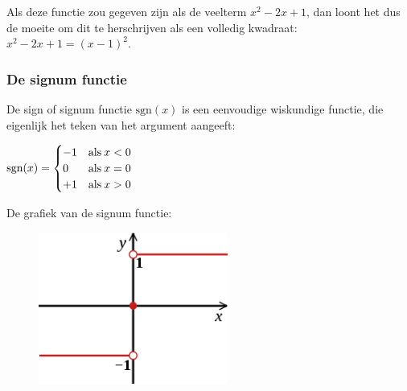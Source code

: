 \noindent Als deze functie zou gegeven zijn als de veelterm ${\displaystyle x^{2}-2x+1}$,
dan loont het dus de moeite om dit te herschrijven als een volledig
kwadraat: ${\displaystyle x^{2}-2x+1=\left(x-1\right)^{2}}$.


\subsubsection{De signum functie}

De sign of signum functie $\textrm{sgn}(x)$ is een eenvoudige wiskundige
functie, die eigenlijk het teken van het argument aangeeft:

${\displaystyle \textrm{sgn}(x)=\begin{cases}
-1 & \textrm{als}\:x<0\\
0 & \textrm{\textrm{als}}\:x=0\\
+1 & \textrm{\textrm{als}}\:x>0
\end{cases}}$

\medskip{}


\noindent De grafiek van de signum functie:

\noindent 
\begin{figure}[h]
\centering{}\includegraphics[height=5cm]{2_elem_rekenvaardigheden_B/inputs/Signum_function_svg} 
\end{figure}

